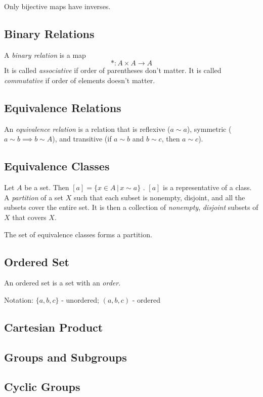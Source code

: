 \documentclass[12pt]{article}
\theoremstyle{definition}
\begin{document}
Only bijective maps have inverses.

\subsection{Binary Relations}

A \emph{binary relation} is a map $$* : A \times A \to A$$ It is called \emph{associative} if order of parentheses don't matter. It is called \emph{commutative} if order of elements doesn't matter. 

\subsection{Equivalence Relations}

An \emph{equivalence relation} is a relation that is reflexive ($a \sim a$), symmetric ($a \sim b \implies b \sim A$), and transitive (if $a \sim b$ and $b \sim c$, then $a \sim c$).

\subsection{Equivalence Classes}

Let $A$ be a set. Then $[a] = \{x \in A \, | \, x \sim a\}$ . $[a]$ is a representative of a class. A \emph{partition} of a set $X$ such that each subset is nonempty, disjoint, and all the subsets cover the entire set. It is then a collection of \emph{nonempty}, \emph{disjoint} subsets of $X$ that covers $X$.

The set of equivalence classes forms a partition.

\subsection{Ordered Set}

An ordered set is a set with an \emph{order}.

Notation: $\{a,b,c\}$ - unordered; $(a,b,c)$ - ordered

\subsection{Cartesian Product}
\subsection{Groups and Subgroups}
\subsection{Cyclic Groups}
\end{document}
